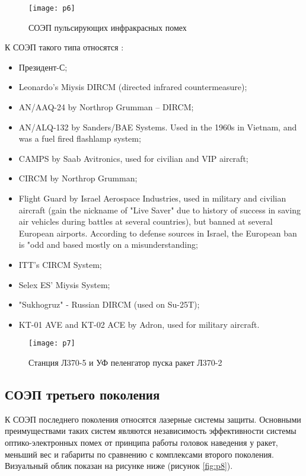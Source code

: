 \begin{figure}[ht]
	\centering
	\texttt{[image: p6]} 
	\caption{СОЭП пульсирующих инфракрасных помех}
	\label{fig:p6}
\end{figure}


К СОЭП такого типа относятся \cite[]{Infrared_countermeasure}:
\begin{itemize}
	\item Президент-С;
	\item Leonardo’s Miysis DIRCM (directed infrared countermeasure);
	\item AN/AAQ-24 by Northrop Grumman – DIRCM;
	\item AN/ALQ-132 by Sanders/BAE Systems. Used in the 1960s in Vietnam, and was a fuel fired flashlamp system;
	\item CAMPS by Saab Avitronics, used for civilian and VIP aircraft;
	\item CIRCM by Northrop Grumman;
	\item Flight Guard by Israel Aerospace Industries, used in military and civilian aircraft (gain the nickname of "Live Saver" due to history of success in saving air vehicles during battles at several countries), but banned at several European airports. According to defense sources in Israel, the European ban is "odd and based mostly on a misunderstanding;
	\item ITT's CIRCM System;
	\item Selex ES' Miysis System;
	\item "Sukhogruz" - Russian DIRCM (used on Su-25T);
	\item KT-01 AVE and KT-02 ACE by Adron, used for military aircraft.		
\end{itemize}

\begin{figure}[ht]
	\centering
	\texttt{[image: p7]} 
	\caption{Станция Л370-5 и УФ пеленгатор пуска ракет Л370-2}
	\label{fig:p7}
\end{figure}

\subsection{СОЭП третьего поколения}	
К СОЭП последнего поколения относятся лазерные системы защиты. Основными преимуществами таких систем являются независимость эффективности системы оптико-электронных помех от принципа работы головок наведения у ракет, меньший вес и габариты по сравнению с комплексами второго поколения. Визуальный облик показан на рисунке ниже (рисунок \ref{fig:p8}).

